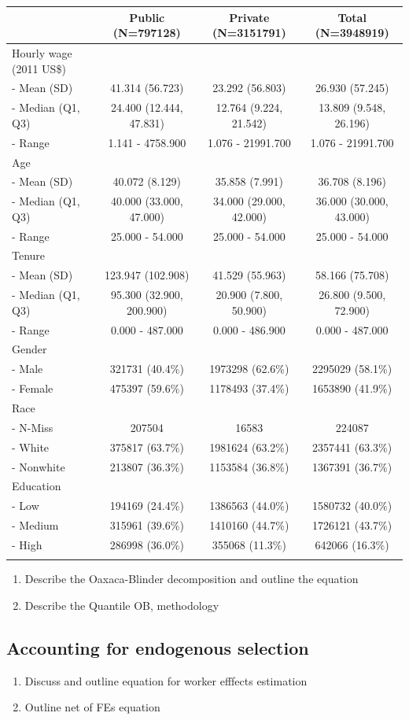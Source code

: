 \documentclass{article}
\begin{document}
\begin{longtable}[c]{@{}lccc@{}}
\toprule
& Public (N=797128) & Private (N=3151791) & Total
(N=3948919)\tabularnewline
\midrule
\endhead
Hourly wage (2011 US\$) & & &\tabularnewline
- Mean (SD) & 41.314 (56.723) & 23.292 (56.803) & 26.930
(57.245)\tabularnewline
- Median (Q1, Q3) & 24.400 (12.444, 47.831) & 12.764 (9.224, 21.542) &
13.809 (9.548, 26.196)\tabularnewline
- Range & 1.141 - 4758.900 & 1.076 - 21991.700 & 1.076 -
21991.700\tabularnewline
Age & & &\tabularnewline
- Mean (SD) & 40.072 (8.129) & 35.858 (7.991) & 36.708
(8.196)\tabularnewline
- Median (Q1, Q3) & 40.000 (33.000, 47.000) & 34.000 (29.000, 42.000) &
36.000 (30.000, 43.000)\tabularnewline
- Range & 25.000 - 54.000 & 25.000 - 54.000 & 25.000 -
54.000\tabularnewline
Tenure & & &\tabularnewline
- Mean (SD) & 123.947 (102.908) & 41.529 (55.963) & 58.166
(75.708)\tabularnewline
- Median (Q1, Q3) & 95.300 (32.900, 200.900) & 20.900 (7.800, 50.900) &
26.800 (9.500, 72.900)\tabularnewline
- Range & 0.000 - 487.000 & 0.000 - 486.900 & 0.000 -
487.000\tabularnewline
Gender & & &\tabularnewline
- Male & 321731 (40.4\%) & 1973298 (62.6\%) & 2295029
(58.1\%)\tabularnewline
- Female & 475397 (59.6\%) & 1178493 (37.4\%) & 1653890
(41.9\%)\tabularnewline
Race & & &\tabularnewline
- N-Miss & 207504 & 16583 & 224087\tabularnewline
- White & 375817 (63.7\%) & 1981624 (63.2\%) & 2357441
(63.3\%)\tabularnewline
- Nonwhite & 213807 (36.3\%) & 1153584 (36.8\%) & 1367391
(36.7\%)\tabularnewline
Education & & &\tabularnewline
- Low & 194169 (24.4\%) & 1386563 (44.0\%) & 1580732
(40.0\%)\tabularnewline
- Medium & 315961 (39.6\%) & 1410160 (44.7\%) & 1726121
(43.7\%)\tabularnewline
- High & 286998 (36.0\%) & 355068 (11.3\%) & 642066
(16.3\%)\tabularnewline
\bottomrule
\label{table:all}
\end{longtable}

\begin{enumerate}
    \item Describe the Oaxaca-Blinder decomposition and outline the equation
    \item Describe the Quantile OB, methodology \cite{chernozhukov_inference_2013} 
\end{enumerate}
\subsection{Accounting for endogenous selection}
\begin{enumerate}
    \item Discuss \cite{canay_simple_2011} and outline equation for worker efffects estimation
    \item Outline net of FEs equation 
\end{enumerate}
\end{document}

